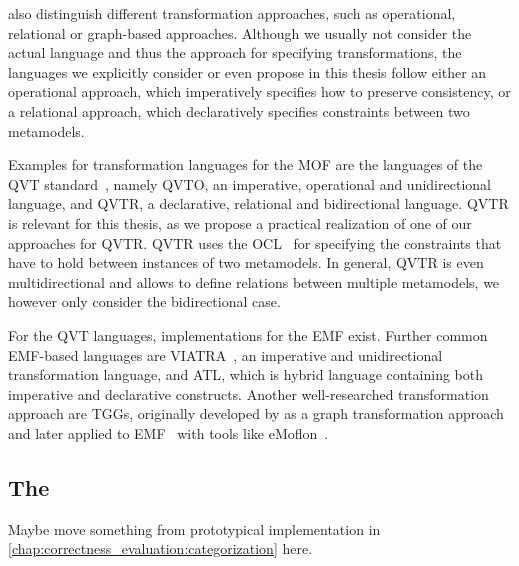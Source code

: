 \textcite{czarnecki2006a} also distinguish different transformation approaches, such as operational, relational or graph-based approaches.
Although we usually not consider the actual language and thus the approach for specifying transformations, the languages we explicitly consider or even propose in this thesis follow either an operational approach, which imperatively specifies how to preserve consistency, or a relational approach, which declaratively specifies constraints between two metamodels.

Examples for transformation languages for the \gls{MOF} are the languages of the \gls{QVT} standard~\cite{qvt}, namely \gls{QVTO}, an imperative, operational and unidirectional language, and \gls{QVTR}, a declarative, relational and bidirectional language.
\gls{QVTR} is relevant for this thesis, as we propose a practical realization of one of our approaches for \gls{QVTR}.
\gls{QVTR} uses the \gls{OCL}~\cite{ocl} for specifying the constraints that have to hold between instances of two metamodels.
In general, \gls{QVTR} is even multidirectional and allows to define relations between multiple metamodels, we however only consider the bidirectional case.

For the \gls{QVT} languages, implementations for the \gls{EMF} exist. Further common \gls{EMF}-based languages are \gls{VIATRA}~\cite{bergmann2015viatra}, an imperative and unidirectional transformation language, and \gls{ATL}, which is hybrid language containing both imperative and declarative constructs.
Another well-researched transformation approach are \glspl{TGG}, originally developed by \cite{schuerr1995a} as a graph transformation approach and later applied to \gls{EMF}~\cite{leblebici2014IncrementalTGGSurvey-GTVMT} with tools like eMoflon~\cite{anjorin2014c}.






\subsection{The \reactionslanguage}
\label{chap:foundations:transformations:reactions}

Maybe move something from prototypical implementation in \autoref{chap:correctness_evaluation:categorization} here.

